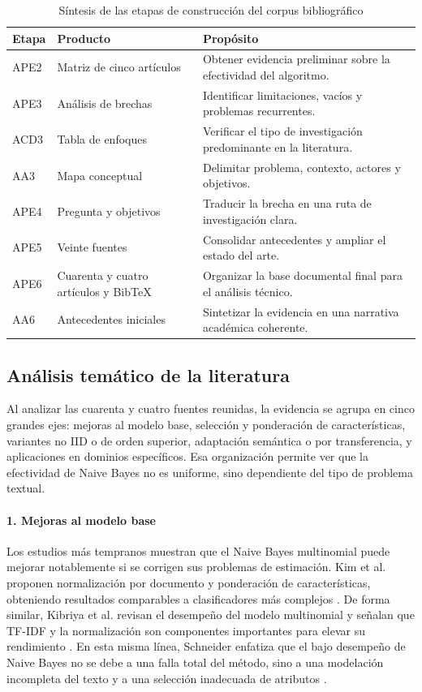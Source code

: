 \begin{table}[H]
\centering
\caption{Síntesis de las etapas de construcción del corpus bibliográfico}
\label{tab:etapas}
\small
\begin{tabularx}{\textwidth}{|L{2.3cm}|L{2.8cm}|X|}
\hline
\textbf{Etapa} & \textbf{Producto} & \textbf{Propósito} \\ \hline
APE2 & Matriz de cinco artículos & Obtener evidencia preliminar sobre la efectividad del algoritmo. \\ \hline
APE3 & Análisis de brechas & Identificar limitaciones, vacíos y problemas recurrentes. \\ \hline
ACD3 & Tabla de enfoques & Verificar el tipo de investigación predominante en la literatura. \\ \hline
AA3 & Mapa conceptual & Delimitar problema, contexto, actores y objetivos. \\ \hline
APE4 & Pregunta y objetivos & Traducir la brecha en una ruta de investigación clara. \\ \hline
APE5 & Veinte fuentes & Consolidar antecedentes y ampliar el estado del arte. \\ \hline
APE6 & Cuarenta y cuatro artículos y BibTeX & Organizar la base documental final para el análisis técnico. \\ \hline
AA6 & Antecedentes iniciales & Sintetizar la evidencia en una narrativa académica coherente. \\ \hline
\end{tabularx}
\end{table}

\subsection{Análisis temático de la literatura}

Al analizar las cuarenta y cuatro fuentes reunidas, la evidencia se agrupa en cinco grandes ejes: mejoras al modelo base, selección y ponderación de características, variantes no IID o de orden superior, adaptación semántica o por transferencia, y aplicaciones en dominios específicos. Esa organización permite ver que la efectividad de Naive Bayes no es uniforme, sino dependiente del tipo de problema textual.

\paragraph{1. Mejoras al modelo base}

Los estudios más tempranos muestran que el Naive Bayes multinomial puede mejorar notablemente si se corrigen sus problemas de estimación. Kim et al. proponen normalización por documento y ponderación de características, obteniendo resultados comparables a clasificadores más complejos \cite{Kim2006}. De forma similar, Kibriya et al. revisan el desempeño del modelo multinomial y señalan que TF-IDF y la normalización son componentes importantes para elevar su rendimiento \cite{10.1007/978-3-540-30549-1_43}. En esta misma línea, Schneider enfatiza que el bajo desempeño de Naive Bayes no se debe a una falla total del método, sino a una modelación incompleta del texto y a una selección inadecuada de atributos \cite{10.1007/978-3-540-30586-6_76}.

